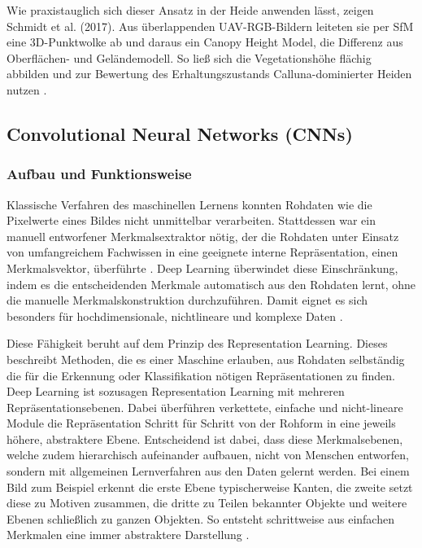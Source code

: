Wie praxistauglich sich dieser Ansatz in der Heide anwenden lässt, zeigen Schmidt et al. (2017). Aus überlappenden UAV-RGB-Bildern leiteten sie per SfM eine 3D-Punktwolke ab und daraus ein Canopy Height Model, die Differenz aus Oberflächen- und Geländemodell. So ließ sich die Vegetationshöhe flächig abbilden und zur Bewertung des Erhaltungszustands Calluna-dominierter Heiden nutzen \cite{Schmidt.2017}.

\subsection{Convolutional Neural Networks (CNNs)}\label{cnns}

\subsubsection{Aufbau und Funktionsweise}\label{cnns_Allgemeines}
Klassische Verfahren des maschinellen Lernens konnten Rohdaten wie die Pixelwerte eines Bildes nicht unmittelbar verarbeiten. Stattdessen war ein manuell entworfener Merkmalsextraktor nötig, der die Rohdaten unter Einsatz von umfangreichem Fachwissen in eine geeignete interne Repräsentation, einen Merkmalsvektor, überführte \cite{LeCun.2015}. Deep Learning überwindet diese Einschränkung, indem es die entscheidenden Merkmale automatisch aus den Rohdaten lernt, ohne die manuelle Merkmalskonstruktion durchzuführen. Damit eignet es sich besonders für hochdimensionale, nichtlineare und komplexe Daten \cite{Yun.2024}.

Diese Fähigkeit beruht auf dem Prinzip des Representation Learning. Dieses beschreibt Methoden, die es einer Maschine erlauben, aus Rohdaten selbständig die für die Erkennung oder Klassifikation nötigen Repräsentationen zu finden. Deep Learning ist sozusagen Representation Learning mit mehreren Repräsentationsebenen. Dabei überführen verkettete, einfache und nicht-lineare Module die Repräsentation Schritt für Schritt von der Rohform in eine jeweils höhere, abstraktere Ebene. Entscheidend ist dabei, dass diese Merkmalsebenen, welche zudem hierarchisch aufeinander aufbauen, nicht von Menschen entworfen, sondern mit allgemeinen Lernverfahren aus den Daten gelernt werden. Bei einem Bild zum Beispiel erkennt die erste Ebene typischerweise Kanten, die zweite setzt diese zu Motiven zusammen, die dritte zu Teilen bekannter Objekte und weitere Ebenen schließlich zu ganzen Objekten. So entsteht schrittweise aus einfachen Merkmalen eine immer abstraktere Darstellung \cite{LeCun.2015}.

